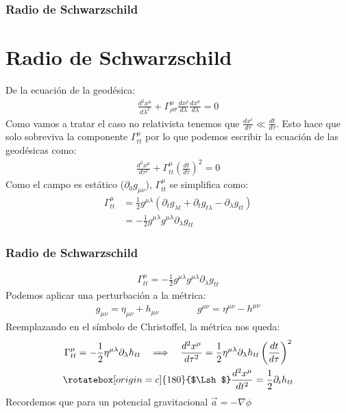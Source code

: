 \documentclass{beamer}
\begin{document}


\begin{frame}
\frametitle{Radio de Schwarzschild}
\section{Radio de Schwarzschild}

De la ecuación de la geodésica: 
\begin{gather*}
  \frac{d ^2 x ^ {\mu } }{d \lambda^2 } + \Gamma _{\rho \sigma } ^ {\mu} \frac{d x^\rho  }{d \lambda} \frac{d x ^ {\sigma} }{d \lambda} = 0 
\end{gather*}
Como vamos a tratar el caso no relativista tenemos que $ \frac{d x ^ {i } }{d \tau } \ll \frac{d t  }{d \tau } $. Esto hace que solo sobreviva la componente $ \Gamma _{tt } ^ {\mu } $ por lo que podemos escribir la ecuación de las geodésicas como: 
\begin{gather*}
  \frac{d ^2 x ^ {\mu } }{d \tau^2 } + \Gamma _{tt } ^ {\mu } \left(\frac{d t  }{d \tau }\right)^2 = 0  
\end{gather*}
Como el campo es estático ($ \partial _0 g _{\mu \nu }  $), $ \Gamma _{tt } ^ {\mu } $ se simplifica como: 
\begin{align*}
  \Gamma _{tt } ^ {\mu } &= \frac{1}{2} g ^ {\mu \lambda} (\partial_t g _{\lambda t } + \partial_t g _{t \lambda} - \partial_\lambda g _{tt }  ) \\
    &= - \frac{1}{2} g ^ {\mu\lambda} g ^{\mu\lambda} \partial_\lambda g _{tt} 
\end{align*}
\end{frame}




\begin{frame}
\frametitle{Radio de Schwarzschild}
\begin{align*}
  \Gamma _{tt } ^ {\mu } = - \frac{1}{2} g ^ {\mu\lambda} g ^{\mu\lambda} \partial_\lambda g _{tt} 
\end{align*}
Podemos aplicar una perturbación a la métrica: 
\begin{gather*}
  g _{\mu \nu} = \eta _{\mu\nu}  + h _{\mu\nu} \qquad \qquad g ^ {\mu\nu} = \eta ^ {\mu\nu} - h ^ {\mu\nu}
\end{gather*}
Reemplazando en el símbolo de Christoffel, la métrica nos queda: 
\begin{gather*}
  \Gamma _{tt } ^ {\mu} = - \frac{1}{2} \eta ^ {\mu\lambda} \partial _{\lambda} h _{tt } \quad \Longrightarrow \quad \frac{d ^2 x ^ {\mu} }{d \tau^2 } = \frac{1}{2} \eta ^ {\mu\lambda} \partial_\lambda h _{tt } \left(\frac{d t  }{d \tau }\right)^2  \\
  \rotatebox[origin=c]{180}{$\Lsh$} \frac{d ^2 x ^ {\mu} }{d t^2 } = \frac{1}{2} \partial _{i }  h _{tt } 
\end{gather*}
Recordemos que para un potencial gravitacional $ \vec a = -\nabla  \phi $
\end{frame}
\end{document}
